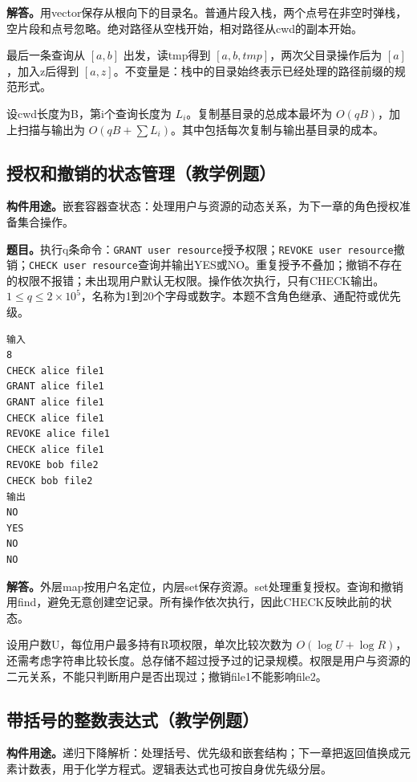\noindent\textbf{解答。}用vector保存从根向下的目录名。普通片段入栈，两个点号在非空时弹栈，空片段和点号忽略。绝对路径从空栈开始，相对路径从cwd的副本开始。

最后一条查询从 $[a,b]$ 出发，读tmp得到 $[a,b,tmp]$，两次父目录操作后为 $[a]$，加入z后得到 $[a,z]$。不变量是：栈中的目录始终表示已经处理的路径前缀的规范形式。

设cwd长度为B，第i个查询长度为 $L_i$。复制基目录的总成本最坏为 $O(qB)$，加上扫描与输出为 $O(qB+\sum L_i)$。其中包括每次复制与输出基目录的成本。

\subsection{授权和撤销的状态管理（教学例题）}
\noindent\textbf{构件用途。}嵌套容器查状态：处理用户与资源的动态关系，为下一章的角色授权准备集合操作。


\noindent\textbf{题目。}执行q条命令：\texttt{GRANT user resource}授予权限；\texttt{REVOKE user resource}撤销；\texttt{CHECK user resource}查询并输出YES或NO。重复授予不叠加；撤销不存在的权限不报错；未出现用户默认无权限。操作依次执行，只有CHECK输出。$1\le q\le2\times10^5$，名称为1到20个字母或数字。本题不含角色继承、通配符或优先级。
\begin{verbatim}
输入
8
CHECK alice file1
GRANT alice file1
GRANT alice file1
CHECK alice file1
REVOKE alice file1
CHECK alice file1
REVOKE bob file2
CHECK bob file2
输出
NO
YES
NO
NO
\end{verbatim}

\noindent\textbf{解答。}外层map按用户名定位，内层set保存资源。set处理重复授权。查询和撤销用find，避免无意创建空记录。所有操作依次执行，因此CHECK反映此前的状态。

设用户数U，每位用户最多持有R项权限，单次比较次数为 $O(\log U+\log R)$，还需考虑字符串比较长度。总存储不超过授予过的记录规模。权限是用户与资源的二元关系，不能只判断用户是否出现过；撤销file1不能影响file2。

\subsection{带括号的整数表达式（教学例题）}
\noindent\textbf{构件用途。}递归下降解析：处理括号、优先级和嵌套结构；下一章把返回值换成元素计数表，用于化学方程式。逻辑表达式也可按自身优先级分层。


